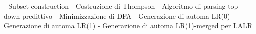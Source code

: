 - Subset construction
- Costruzione di Thompson
- Algoritmo di parsing top-down predittivo
- Minimizzazione di DFA
- Generazione di automa LR(0)
- Generazione di automa LR(1)
- Generazione di automa LR(1)-merged per LALR